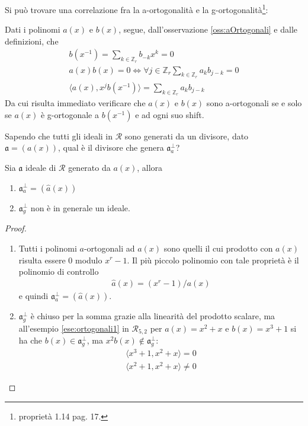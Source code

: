 Si può trovare una correlazione fra la a-ortogonalità e la g-ortogonalità\footnote{\cite{cerruti} proprietà 1.14 pag. 17.}:
\begin{osservazione} \label{oss:aOrtogonali2}
   Dati i polinomi $a(x)$ e $b(x)$, segue, dall'osservazione \ref{oss:aOrtogonali} e dalle definizioni, che
   \begin{align*}
      b(x^{-1}) = \sum_{k \in \mathbb{Z}_{r}} b_{-k}x^{k} = 0 \\
      a(x)b(x) = 0 \iff \forall j \in \mathbb{Z}_{r}  \sum_{k \in \mathbb{Z}_{r}} a_{k}b_{j-k} = 0 \\
      \langle a(x), x^{j}b(x^{-1}) \rangle = \sum_{k \in \mathbb{Z}_{r} } a_{k}b_{j-k}
   \end{align*}
   Da cui risulta immediato verificare che $a(x)$ e $b(x)$ sono a-ortogonali se e solo se $a(x)$ è g-ortogonale a $b(x^{-1})$ e ad ogni suo shift.
\end{osservazione}
Sapendo che tutti gli ideali in $\mathcal{R}$ sono generati da un divisore, dato $\mathfrak{a} = (a(x))$, qual è il divisore che genera $\mathfrak{a}_{a}^{\perp}$?
\begin{lemmax} \label{lemma:idOrtogonali}
   Sia $\mathfrak{a} $ ideale di $\mathcal{R}$ generato da $a(x)$, allora
   \begin{enumerate}
      \item $\mathfrak{a}_{a}^{\perp} = (\hat{a}(x))$
      \item $\mathfrak{a}_{g}^{\perp} $ non è in generale un ideale.
   \end{enumerate}
\end{lemmax}
\begin{proof}
   \begin{enumerate}
      \item Tutti i polinomi $a$-ortogonali ad $a(x)$ sono quelli il cui prodotto con $a(x)$ risulta essere $0$ modulo $x^r - 1$. Il più piccolo polinomio con tale proprietà è il polinomio di controllo
      \begin{align*}
         \hat{a}(x) = (x^r-1)/a(x)
      \end{align*}
      e quindi $\mathfrak{a}_{a}^{\perp} = (\hat{a}(x))$.
      \item $\mathfrak{a}_{g}^{\perp} $ è chiuso per la somma grazie alla linearità del prodotto scalare, ma all'esempio \ref{ese:ortogonali1} in $\mathcal{R}_{5,2}$ per $a(x) = x^2+x$ e $b(x) = x^3 + 1$ si ha che $b(x) \in \mathfrak{a}_{g}^{\perp}$, ma $x^{2}b(x) \notin \mathfrak{a}_{g}^{\perp}$:
      \begin{align*}
         \langle x^3 + 1, x^2+x \rangle = 0\\
         \langle x^2 + 1, x^2+x \rangle \neq 0
      \end{align*}
   \end{enumerate}
\end{proof}
